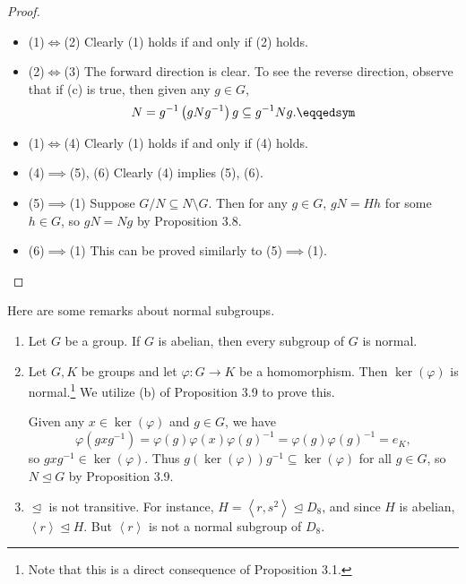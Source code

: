 \documentclass[pmath347]{subfiles}
\begin{document}
    \begin{proof}
        \begin{itemize}
            \item (1)$\iff$(2) Clearly (1) holds if and only if (2) holds. \qqqedsym
            \item (2)$\iff$(3) The forward direction is clear. To see the reverse direction, observe that if (c) is true, then given any $g\in G$,
                    \begin{equation*}
                        N = g^{-1} \left( gNg^{-1}  \right) g \subseteq g^{-1} Ng. \eqqedsym
                    \end{equation*}
            \item (1)$\iff$(4) Clearly (1) holds if and only if (4) holds. \qqqedsym
            \item (4)$\implies$(5), (6) Clearly (4) implies (5), (6). \qqqedsym
            \item (5)$\implies$(1) Suppose $G /N\subseteq N\setminus G$. Then for any $g\in G$, $gN=Hh$ for some $h\in G$, so $gN=Ng$ by Proposition 3.8. \qqqedsym
            \item (6)$\implies$(1) This can be proved similarly to (5)$\implies$(1).
        \end{itemize} 
    \end{proof}

    \np Here are some remarks about normal subgroups.
    \begin{enumerate}
        \item Let $G$ be a group. If $G$ is abelian, then every subgroup of $G$ is normal.
        \item Let $G,K$ be groups and let $\varphi:G\to K$ be a homomorphism. Then $\ker\left( \varphi \right)$ is normal.\footnote{Note that this is a direct consequence of Proposition 3.1.} We utilize (b) of Proposition 3.9 to prove this.

            \begin{subproof}
                Given any $x\in\ker\left( \varphi \right) $ and $g\in G$, we have
                \begin{equation*}
                    \varphi\left( gxg^{-1}  \right) =\varphi\left( g \right) \varphi\left( x \right) \varphi\left( g \right) ^{-1} = \varphi\left( g \right) \varphi\left( g \right) ^{-1} = e_K,
                \end{equation*}
                so $gxg^{-1} \in\ker\left( \varphi \right)$. Thus $g\left( \ker\left( \varphi \right)  \right) g^{-1} \subseteq \ker\left( \varphi \right)$ for all $g\in G$, so $N\trianglelefteq G$ by Proposition 3.9.
            \end{subproof}
        \item $\trianglelefteq$ is not transitive. For instance, $H=\left< r,s^{2}  \right> \trianglelefteq D_8$, and since $H$ is abelian, $\left< r \right> \trianglelefteq H$. But $\left< r \right> $ is not a normal subgroup of $D_8$. 
    \end{enumerate}
\end{document}
